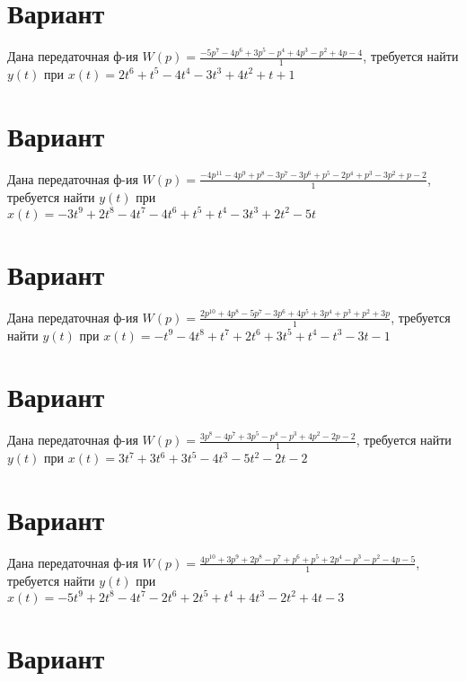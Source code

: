 \documentclass{article}
\begin{document}
\section{Вариант}

Дана передаточная ф-ия $W(p)=\frac{-5p^{7}-4p^{6}+3p^{5}-p^{4}+4p^{3}-p^{2}+4p-4}{1}$, требуется найти $y(t)$ при $x(t)=2t^{6}+t^{5}-4t^{4}-3t^{3}+4t^{2}+t+1$



\section{Вариант}

Дана передаточная ф-ия $W(p)=\frac{-4p^{11}-4p^{9}+p^{8}-3p^{7}-3p^{6}+p^{5}-2p^{4}+p^{3}-3p^{2}+p-2}{1}$, требуется найти $y(t)$ при $x(t)=-3t^{9}+2t^{8}-4t^{7}-4t^{6}+t^{5}+t^{4}-3t^{3}+2t^{2}-5t$



\section{Вариант}

Дана передаточная ф-ия $W(p)=\frac{2p^{10}+4p^{8}-5p^{7}-3p^{6}+4p^{5}+3p^{4}+p^{3}+p^{2}+3p}{1}$, требуется найти $y(t)$ при $x(t)=-t^{9}-4t^{8}+t^{7}+2t^{6}+3t^{5}+t^{4}-t^{3}-3t-1$



\section{Вариант}

Дана передаточная ф-ия $W(p)=\frac{3p^{8}-4p^{7}+3p^{5}-p^{4}-p^{3}+4p^{2}-2p-2}{1}$, требуется найти $y(t)$ при $x(t)=3t^{7}+3t^{6}+3t^{5}-4t^{3}-5t^{2}-2t-2$



\section{Вариант}

Дана передаточная ф-ия $W(p)=\frac{4p^{10}+3p^{9}+2p^{8}-p^{7}+p^{6}+p^{5}+2p^{4}-p^{3}-p^{2}-4p-5}{1}$, требуется найти $y(t)$ при $x(t)=-5t^{9}+2t^{8}-4t^{7}-2t^{6}+2t^{5}+t^{4}+4t^{3}-2t^{2}+4t-3$



\section{Вариант}
\end{document}
